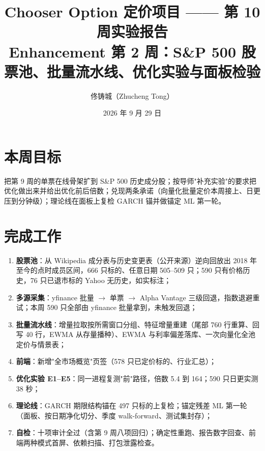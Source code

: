 \documentclass[11pt]{ctexart}
\title{\textbf{Chooser Option 定价项目 —— 第 10 周实验报告}\\
\large Enhancement 第 2 周：S\&P 500 股票池、批量流水线、优化实验与面板检验}
\author{佟铸城（Zhucheng Tong）}
\date{2026 年 9 月 29 日}
\begin{document}
\maketitle

\section{本周目标}
把第 9 周的单票在线骨架扩到 S\&P 500 历史成分股；按导师"补充实验"的要求把优化做出来并给出优化前后倍数；兑现两条承诺（向量化批量定价本周接上、日更压到分钟级）；理论线在面板上复检 GARCH 锚并做锚定 ML 第一轮。

\section{完成工作}
\begin{enumerate}
  \item \textbf{股票池}：从 Wikipedia 成分表与历史变更表（公开来源）逆向回放出 2018 年至今的点时成员区间，666 只标的、任意日期 505--509 只；590 只有价格历史，76 只已退市标的 Yahoo 无历史，如实标注；
  \item \textbf{多源采集}：yfinance 批量 $\to$ 单票 $\to$ Alpha Vantage 三级回退，指数退避重试；本周 590 只全部由 yfinance 批量拿到，未触发回退；
  \item \textbf{批量流水线}：增量拉取按所需窗口分组、特征增量重建（尾部 760 行重算、回写 40 行，EWMA 从存量播种）、EWMA 与利率偏差落库、一次向量化全池定价与情景表；
  \item \textbf{前端}：新增"全市场概览"页签（578 只已定价标的、行业汇总）；
  \item \textbf{优化实验 E1--E5}：同一进程复测"前"路径，倍数 5.4 到 164；590 只日更实测 38 秒；
  \item \textbf{理论线}：GARCH 期限结构锚在 497 只标的上复检；锚定残差 ML 第一轮（面板、按日期净化切分、季度 walk-forward、测试集封存）；
  \item \textbf{自检}：十项审计全过（含第 9 周八项回归）；确定性重跑、报告数字回查、前端两种模式首屏、依赖扫描、打包泄露检查。
\end{enumerate}
\end{document}
